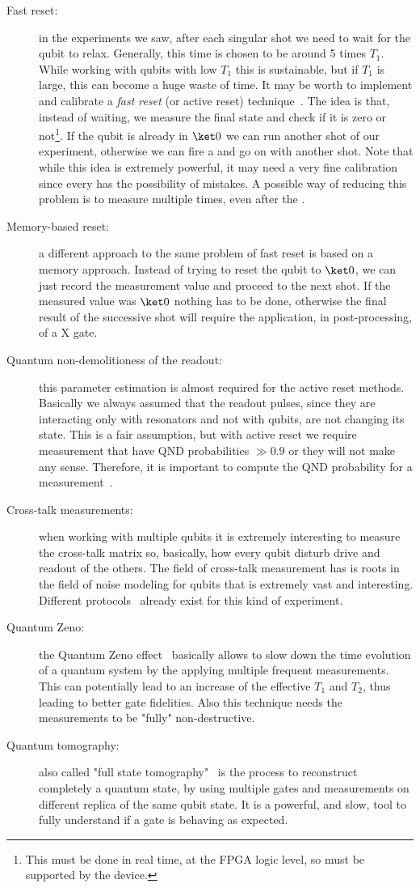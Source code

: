 \begin{description}
    \item[Fast reset:] in the experiments we saw, after each singular shot we need to wait for the qubit to relax. Generally, this time is chosen to be around 5 times $T_1$. While working with qubits with low $T_1$ this is sustainable, but if $T_1$ is large, this can become a huge waste of time. It may be worth to implement and calibrate a \textit{fast reset} (or active reset) technique~\cite{Magnard2018}. The idea is that, instead of waiting, we measure the final state and check if it is zero or not\footnote{This must be done in real time, at the FPGA logic level, so must be supported by the device.}. If the qubit is already in $\ket 0$ we can run another shot of our experiment, otherwise we can fire a \pipulse and go on with another shot. Note that while this idea is extremely powerful, it may need a very fine calibration since every \pipulse has the possibility of mistakes. A possible way of reducing this problem is to measure multiple times, even after the \pipulse.
    \item[Memory-based reset:] a different approach to the same problem of fast reset is based on a memory approach. Instead of trying to reset the qubit to $\ket 0$, we can just record the measurement value and proceed to the next shot. If the measured value was $\ket 0$ nothing has to be done, otherwise the final result of the successive shot will require the application, in post-processing, of a X gate.
    \item[Quantum non-demolitioness of the readout: ] this parameter estimation is almost required for the active reset methods. Basically we always assumed that the readout pulses, since they are interacting only with resonators and not with qubits, are not changing its state. This is a fair assumption, but with active reset we require measurement that have QND probabilities $\gg 0.9$ or they will not make any sense. Therefore, it is important to compute the QND probability for a measurement~\cite{Gao2021}.
    \item[Cross-talk measurements:] when working with multiple qubits it is extremely interesting to measure the cross-talk matrix so, basically, how every qubit disturb drive and readout of the others. The field of cross-talk measurement has is roots in the field of noise modeling for qubits that is extremely vast and interesting.
    Different protocols~\cite{Barrett2023} already exist for this kind of experiment.
    \item[Quantum Zeno:] the Quantum Zeno effect~\cite{Harrington2017, Itano2009} basically allows to slow down the time evolution of a quantum system by the applying multiple frequent measurements. This can potentially lead to an increase of the effective $T_1$ and $T_2$, thus leading to better gate fidelities. Also this technique needs the measurements to be "fully" non-destructive.
    \item[Quantum tomography:] also called "full state tomography"~\cite{Altepeter2004} is the process to reconstruct completely a quantum state, by using multiple gates and measurements on different replica of the same qubit state. It is a powerful, and slow, tool to fully understand if a gate is behaving as expected.
\end{description}